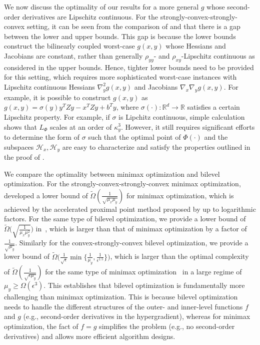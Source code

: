 \documentclass{osudissert96}
\begin{document}
\vspace{0.3cm}
 We now discuss the optimality of our results for a more general $g$ whose second-order derivatives are Lipschitz continuous. For the strongly-convex-strongly-convex setting, it can be seen from the comparison of  and  that  there is a gap between the lower and upper bounds. This gap is because the lower bounds construct the bilinearly coupled worst-case $g(x,y)$ whose Hessians and Jacobians are constant, rather than generally $\rho_{yy}$- and $\rho_{xy}$-Lipschitz continuous as considered in the upper bounds. Hence, tighter lower bounds need to be provided for this setting, which requires more sophisticated  worst-case instances with Lipschitz continuous Hessians $\nabla_y^2 g(x,y)$ and Jacobians $\nabla_x\nabla_yg(x,y)$.  For example, it is possible to construct $g(x,y)$ as $g(x,y)=\sigma(y)y^T Zy - x^TZy +b^Ty$, where $\sigma(\cdot):\mathbb{R}^d\rightarrow \mathbb{R}$ satisfies a certain Lipschitz property. For example, if $\sigma$ is Lipchitz continuous, simple calculation shows that $L_\Phi$ scales at an order of $\kappa_y^3$. However, it still requires significant efforts to determine the form of $\sigma$ such that the optimal point of $\Phi(\cdot)$  and the subspaces $\mathcal{H}_x,\mathcal{H}_y$ are easy to characterize and satisfy the properties outlined in the proof of .  

\vspace{0.3cm}
 We compare the optimality between minimax optimization and bilevel optimization. For the strongly-convex-strongly-convex minimax optimization, \cite{zhang2019lower} developed a lower bound of  {\small$\widetilde{\Omega}(\frac{1}{\sqrt{\mu_x\mu_y}})$} for minimax optimization, which is achieved by the accelerated proximal point method proposed by \cite{lin2020near} up to logarithmic factors. 
For the same type of bilevel optimization,
we provide a lower bound of {\small$\widetilde{\Omega}\big(\sqrt{\frac{1}{\mu_x\mu_y^2}}\big)$} in~, which is larger than that of minimax optimization by a factor of $\frac{1}{\sqrt{\mu_y}}$.  Similarly for the convex-strongly-convex bilevel optimization, we provide a lower bound of {\small $\widetilde \Omega\big(\frac{1}{\sqrt{\epsilon}}\min\{\frac{1}{\mu_y},\frac{1}{\epsilon^{1.5}}\}\big)$}, which is larger than the optimal complexity of {\small$\widetilde{\Omega}(\frac{1}{\sqrt{\epsilon\mu_y}})$} for the same type of minimax optimization~\cite{lin2020near} in a large regime of $\mu_y\geq\Omega(\epsilon^3)$. 
This establishes that bilevel optimization is fundamentally more challenging than minimax optimization. This is because bilevel optimization needs to handle the different structures of the outer- and inner-level functions $f$ and $g$ (e.g., second-order derivatives in the hypergradient), whereas for minimax optimization, the fact of $f=g$ simplifies the problem (e.g., no second-order derivatives) and allows more efficient algorithm designs. 
\end{document}
